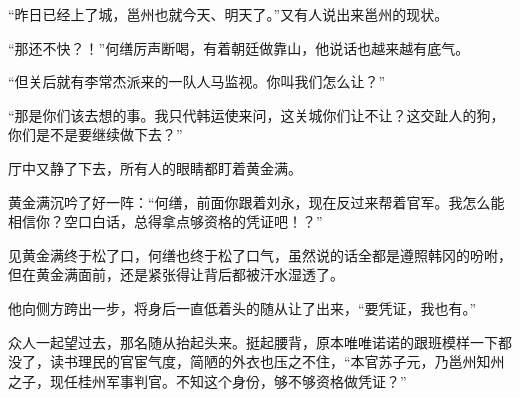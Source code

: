 “昨日已经上了城，邕州也就今天、明天了。”又有人说出来邕州的现状。

“那还不快？！”何缮厉声断喝，有着朝廷做靠山，他说话也越来越有底气。

“但关后就有李常杰派来的一队人马监视。你叫我们怎么让？”

“那是你们该去想的事。我只代韩运使来问，这关城你们让不让？这交趾人的狗，你们是不是要继续做下去？”

厅中又静了下去，所有人的眼睛都盯着黄金满。

黄金满沉吟了好一阵：“何缮，前面你跟着刘永，现在反过来帮着官军。我怎么能相信你？空口白话，总得拿点够资格的凭证吧！？”

见黄金满终于松了口，何缮也终于松了口气，虽然说的话全都是遵照韩冈的吩咐，但在黄金满面前，还是紧张得让背后都被汗水湿透了。

他向侧方跨出一步，将身后一直低着头的随从让了出来，“要凭证，我也有。”

众人一起望过去，那名随从抬起头来。挺起腰背，原本唯唯诺诺的跟班模样一下都没了，读书理民的官宦气度，简陋的外衣也压之不住，“本官苏子元，乃邕州知州之子，现任桂州军事判官。不知这个身份，够不够资格做凭证？”

